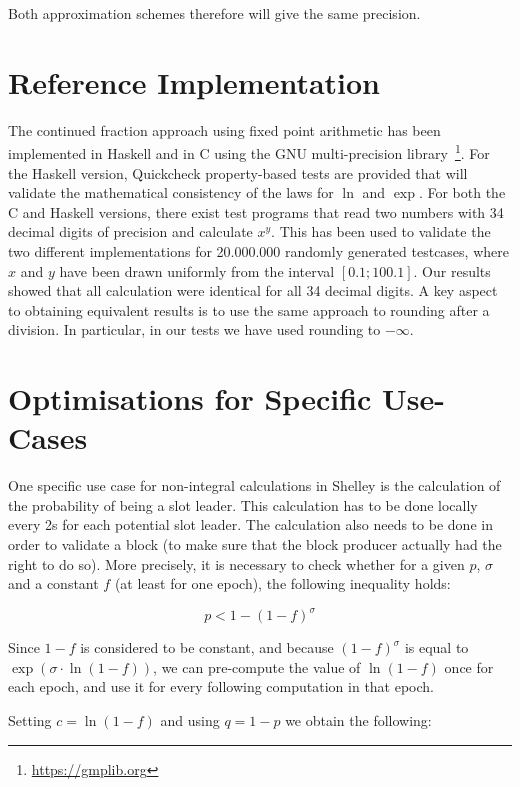 \documentclass[11pt,a4paper,dvipsnames,twosided]{article}
\theoremstyle{definition}
\theoremstyle{definition}
\begin{document}
Both approximation schemes therefore will give the same precision.

\section{Reference Implementation}
\label{sec:refer-impl}

The continued fraction approach using fixed point arithmetic has been
implemented in Haskell and in C using the GNU multi-precision
library~\footnote{\url{https://gmplib.org}}.
%
For the Haskell version, Quickcheck property-based tests are provided that will validate
the mathematical consistency of the laws for $\ln$ and $\exp$.
%
For both the C and Haskell versions, there exist test programs that read
two numbers with 34 decimal digits of precision and calculate
$x^{y}$. This has been used to validate the two different
implementations for 20.000.000 randomly generated testcases, where $x$ and $y$
have been drawn uniformly from the interval $[0.1; 100.1]$. Our results showed that all
calculation were identical for all 34 decimal digits.
A key aspect to obtaining equivalent results is to use the same approach to
rounding after a division. In particular, in our tests we have used rounding to $-\infty$.

\section{Optimisations for Specific Use-Cases}
\label{sec:optim-spec-use}

One specific use case for non-integral calculations in Shelley is the calculation of the
probability of being a slot leader. This calculation has to be done locally every 2s
for each potential slot leader. The calculation also needs to be done in order to
validate a block (to make sure that the block producer actually had the right to
do so).
%
More precisely, it is necessary to check whether for a given $p$, $\sigma$ and a
constant $f$ (at least for one epoch), the following inequality holds:

\begin{equation*}
  p < 1 - {(1 - f)}^{\sigma}
\end{equation*}

Since $1-f$ is considered to be constant, and because ${(1-f)}^{\sigma}$ is equal
to $\exp(\sigma\cdot\ln(1-f))$, we can pre-compute the value of $\ln(1-f)$ once for
each epoch, and use it for every following computation in that epoch.

Setting $c= \ln(1 - f)$ and using $q = 1 - p$ we obtain the following:
\end{document}
